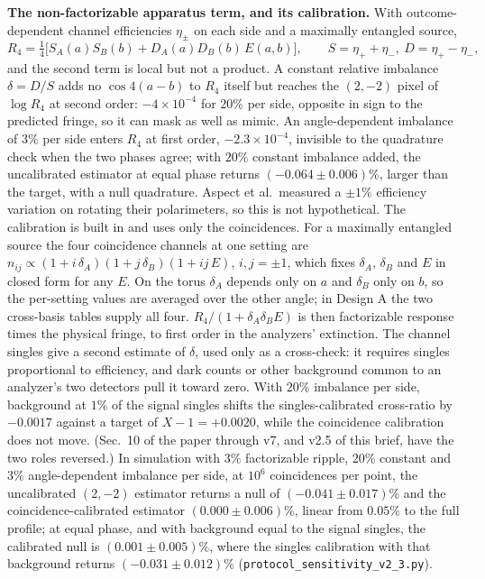 \documentclass[10pt]{article}
\begin{document}
\textbf{The non-factorizable apparatus term, and its calibration.} With outcome-dependent channel efficiencies $\eta_\pm$ on each side and a maximally entangled source,
\[
R_4 = \tfrac14\big[S_A(a)S_B(b) + D_A(a)D_B(b)\,E(a,b)\big],\qquad S=\eta_++\eta_-,\ D=\eta_+-\eta_-,
\]
and the second term is local but not a product. A constant relative imbalance $\delta=D/S$ adds no $\cos 4(a-b)$ to $R_4$ itself but reaches the $(2,-2)$ pixel of $\log R_4$ at second order: $-4\times 10^{-4}$ for $20\%$ per side, opposite in sign to the predicted fringe, so it can mask as well as mimic. An angle-dependent imbalance of $3\%$ per side enters $R_4$ at first order, $-2.3\times 10^{-4}$, invisible to the quadrature check when the two phases agree; with $20\%$ constant imbalance added, the uncalibrated estimator at equal phase returns $(-0.064\pm0.006)\%$, larger than the target, with a null quadrature. Aspect et al.\ measured a $\pm 1\%$ efficiency variation on rotating their polarimeters, so this is not hypothetical. The calibration is built in and uses only the coincidences. For a maximally entangled source the four coincidence channels at one setting are $n_{ij}\propto(1+i\,\delta_A)(1+j\,\delta_B)(1+ij\,E)$, $i,j=\pm1$, which fixes $\delta_A$, $\delta_B$ and $E$ in closed form for any $E$. On the torus $\delta_A$ depends only on $a$ and $\delta_B$ only on $b$, so the per-setting values are averaged over the other angle; in Design A the two cross-basis tables supply all four. $R_4/(1+\delta_A\delta_B E)$ is then factorizable response times the physical fringe, to first order in the analyzers' extinction. The channel singles give a second estimate of $\delta$, used only as a cross-check: it requires singles proportional to efficiency, and dark counts or other background common to an analyzer's two detectors pull it toward zero. With $20\%$ imbalance per side, background at $1\%$ of the signal singles shifts the singles-calibrated cross-ratio by $-0.0017$ against a target of $X-1=+0.0020$, while the coincidence calibration does not move. (Sec.~10 of the paper through v7, and v2.5 of this brief, have the two roles reversed.) In simulation with $3\%$ factorizable ripple, $20\%$ constant and $3\%$ angle-dependent imbalance per side, at $10^6$ coincidences per point, the uncalibrated $(2,-2)$ estimator returns a null of $(-0.041\pm 0.017)\%$ and the coincidence-calibrated estimator $(0.000\pm 0.006)\%$, linear from $0.05\%$ to the full profile; at equal phase, and with background equal to the signal singles, the calibrated null is $(0.001\pm0.005)\%$, where the singles calibration with that background returns $(-0.031\pm0.012)\%$ (\texttt{protocol\_sensitivity\_v2\_3.py}).
\end{document}
